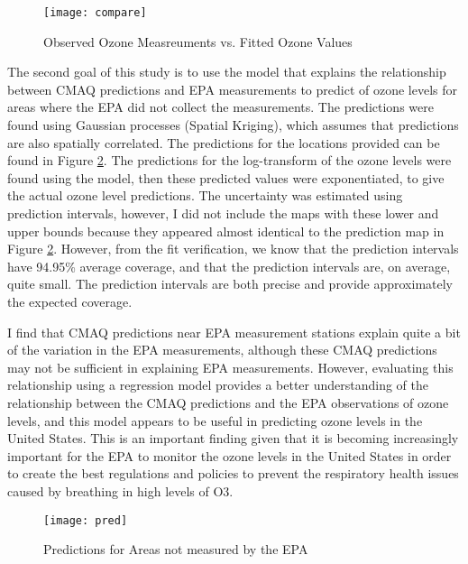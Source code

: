 \documentclass{svproc}
\begin{document}
\begin{figure}
\begin{center}
\caption{Observed Ozone Measreuments vs. Fitted Ozone Values}
\texttt{[image: compare]}
\label{compare}
\smallskip
\end{center}
\end{figure}

The second goal of this study is to use the model that explains the relationship between CMAQ predictions and EPA measurements to predict of ozone levels for areas where the EPA did not collect the measurements. The predictions were found using Gaussian processes (Spatial Kriging), which assumes that predictions are also spatially correlated. The predictions for the locations provided can be found in Figure \ref{pred}. The predictions for the log-transform of the ozone levels were found using the model, then these predicted values were exponentiated, to give the actual ozone level predictions. The uncertainty was estimated using prediction intervals, however, I did not include the maps with these lower and upper bounds because they appeared almost identical to the prediction map in Figure \ref{pred}. However, from the fit verification, we know that the prediction intervals have 94.95\% average coverage, and that the prediction intervals are, on average, quite small. The prediction intervals are both precise and provide approximately the expected coverage. 

I find that CMAQ predictions near EPA measurement stations explain quite a bit of the variation in the EPA measurements, although these CMAQ predictions may not be sufficient in explaining EPA measurements. However, evaluating this relationship using a regression model provides a better understanding of the relationship between the CMAQ predictions and the EPA observations of ozone levels, and this model appears to be useful in predicting ozone levels in the United States. This is an important finding given that it is becoming increasingly important for the EPA to monitor the ozone levels in the United States in order to create the best regulations and policies to prevent the respiratory health issues caused by breathing in high levels of O3. 

\begin{figure}
\begin{center}
\caption{Predictions for Areas not measured by the EPA}
\texttt{[image: pred]}
\label{pred}
\smallskip
\end{center}
\end{figure}
\end{document}
